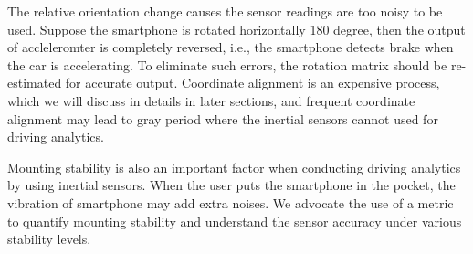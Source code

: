 The relative orientation change causes the sensor
readings are too noisy to be used.
Suppose the smartphone is rotated horizontally 
180 degree, then the output of accleleromter 
is completely reversed, i.e., the smartphone
detects brake when the car is accelerating. 
To eliminate such errors, 
the rotation matrix should be
re-estimated for accurate output. 
Coordinate alignment is an expensive process, 
which we will discuss in details in later sections, 
and frequent coordinate alignment may lead to 
gray period where the inertial sensors
cannot used for driving analytics. 



Mounting stability is also an important factor when 
conducting driving analytics by using inertial sensors. 
When the user puts
the smartphone in the pocket,
the vibration of smartphone may add extra noises.
We advocate the use of a metric to quantify mounting stability
and understand the sensor accuracy under
various stability levels. 


